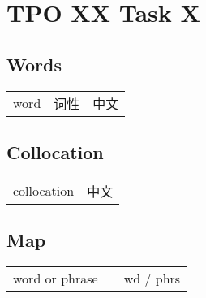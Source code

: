 \section{TPO XX Task X}

\subsection{Words}

\begin{tabular}{lll}
    word & 词性 & 中文\\
\end{tabular}

\subsection{Collocation}

\begin{tabular}{ll}
    collocation & 中文\\
\end{tabular}

\subsection{Map}

\begin{tabular}{rc@{\quad$\to$\quad}l}
    word or phrase && wd / phrs\\
\end{tabular}

\newpage
